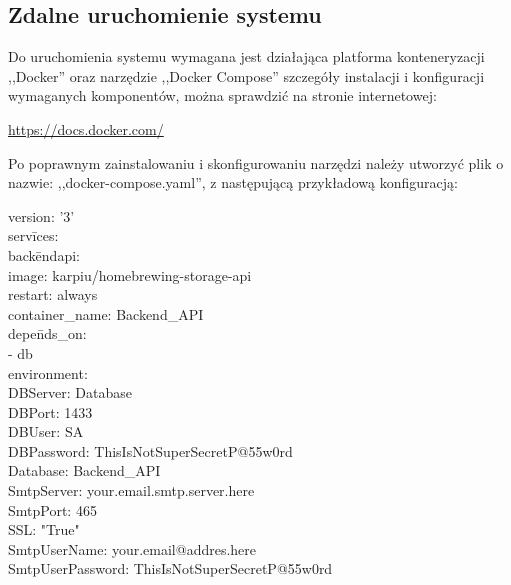 \documentclass[12pt,a4paper]{article}
\begin{document}
		\subsection{Zdalne uruchomienie systemu}
			\indent Do uruchomienia systemu wymagana jest działająca platforma konteneryzacji ,,Docker''
			oraz narzędzie ,,Docker Compose'' szczegóły instalacji i konfiguracji wymaganych
			komponentów, można sprawdzić na stronie internetowej:
			\begin{tcolorbox}[minipage,colback=white,arc=0pt,outer arc=0pt, fontupper=\scriptsize]
				\center					
				\url{https://docs.docker.com/}
			\end{tcolorbox}			
			Po poprawnym zainstalowaniu i skonfigurowaniu narzędzi należy utworzyć plik o nazwie: ,,docker-compose.yaml'',
			z następującą przykładową konfiguracją:  
			\begin{tcolorbox}[minipage,colback=white,arc=0pt,outer arc=0pt, fontupper=\scriptsize]
				\begin{tabbing}
						version: '3' \\
						serv\= ices: \\
						\> back\= endapi: \\
        				\>\> image: karpiu/homebrewing-storage-api \\
        				\>\> restart: always \\
        				\>\> container\_name: Backend\_API \\
        				\>\> depe\= nds\_on: \\
            			\>\>\> - db \\ 
        				\>\> environment: \\ 
            			\>\>\> DBServer: Database \\ 
            			\>\>\> DBPort: 1433 \\ 
            			\>\>\> DBUser: SA \\
            			\>\>\> DBPassword: ThisIsNotSuperSecretP@55w0rd \\
            			\>\>\> Database: Backend\_API \\
            			\>\>\> SmtpServer: your.email.smtp.server.here \\
            			\>\>\> SmtpPort: 465 \\
						\>\>\> SSL: "True" \\
            			\>\>\> SmtpUserName: your.email@addres.here \\
            			\>\>\> SmtpUserPassword: ThisIsNotSuperSecretP@55w0rd \\

\end{tabbing}
\end{tcolorbox}
\end{document}
